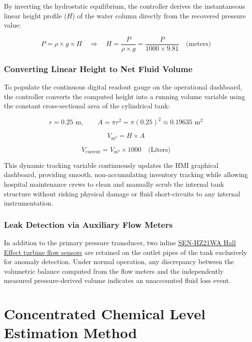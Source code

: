 \documentclass[12pt,a4paper]{article}
\begin{document}
By inverting the hydrostatic equilibrium, the controller derives the instantaneous linear height profile ($H$) of the water column directly from the recovered pressure value:

\[
P = \rho \times g \times H
\quad \Rightarrow \quad
H = \frac{P}{\rho \times g} = \frac{P}{1000 \times 9.81}
\quad \text{(meters)}
\]

\subsubsection*{Converting Linear Height to Net Fluid Volume}

To populate the continuous digital readout gauge on the operational dashboard, the controller converts the computed height into a running volume variable using the constant cross-sectional area of the cylindrical tank:

\[
r = 0.25\text{ m}, \qquad A = \pi r^2 = \pi(0.25)^2 \approx 0.19635\text{ m}^2
\]

\[
V_{\text{m}^3} = H \times A
\]

\[
V_{\text{current}} = V_{\text{m}^3} \times 1000
\quad \text{(Liters)}
\]

This dynamic tracking variable continuously updates the HMI graphical dashboard, providing smooth, non-accumulating inventory tracking while allowing hospital maintenance crews to clean and manually scrub the internal tank structure without risking physical damage or fluid short-circuits to any internal instrumentation.

\subsubsection*{Leak Detection via Auxiliary Flow Meters}

In addition to the primary pressure transducer, two inline \href{https://www.duino.lk/product/ht30-water-flow-sensor-ac/}{SEN-HZ21WA Hall Effect turbine flow sensors} are retained on the outlet pipes of the tank exclusively for anomaly detection. Under normal operation, any discrepancy between the volumetric balance computed from the flow meters and the independently measured pressure-derived volume indicates an unaccounted fluid loss event.
\section{Concentrated Chemical Level Estimation Method}
\end{document}
